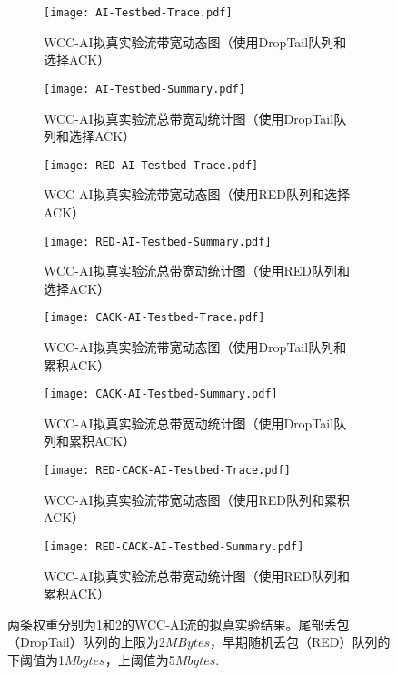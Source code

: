 \documentclass[winfonts]{njuthesis}
\begin{document}
\begin{figure*}[h]
	\begin{subfigure}{.5\textwidth}
    \centering
		\texttt{[image: AI-Testbed-Trace.pdf]}
    \caption{WCC-AI拟真实验流带宽动态图（使用DropTail队列和选择ACK）}
    \label{fig:AI-TestbedTrace}
  \end{subfigure}
	\begin{subfigure}{.5\textwidth}
    \centering
		\texttt{[image: AI-Testbed-Summary.pdf]}
    \caption{WCC-AI拟真实验流总带宽动统计图（使用DropTail队列和选择ACK）}
    \label{fig:AI-TestbedSum}
  \end{subfigure}
  \begin{subfigure}{.5\textwidth}
    \centering
		\texttt{[image: RED-AI-Testbed-Trace.pdf]}
    \caption{WCC-AI拟真实验流带宽动态图（使用RED队列和选择ACK）}
    \label{fig:RED-AI-TestbedTrace}
  \end{subfigure}
  \begin{subfigure}{.5\textwidth}
    \centering
		\texttt{[image: RED-AI-Testbed-Summary.pdf]}
    \caption{WCC-AI拟真实验流总带宽动统计图（使用RED队列和选择ACK）}
    \label{fig:RED-AI-TestbedSum}
  \end{subfigure}
	\begin{subfigure}{.5\textwidth}
    \centering
    \texttt{[image: CACK-AI-Testbed-Trace.pdf]}
    \caption{WCC-AI拟真实验流带宽动态图（使用DropTail队列和累积ACK）}
		\label{fig:CACK-AI-TestbedTrace}
  \end{subfigure}
	\begin{subfigure}{.5\textwidth}
    \centering
    \texttt{[image: CACK-AI-Testbed-Summary.pdf]}
    \caption{WCC-AI拟真实验流总带宽动统计图（使用DropTail队列和累积ACK）}
		\label{fig:CACK-AI-TestbedSum}
  \end{subfigure}
	\begin{subfigure}{.5\textwidth}
    \centering
    \texttt{[image: RED-CACK-AI-Testbed-Trace.pdf]}
    \caption{WCC-AI拟真实验流带宽动态图（使用RED队列和累积ACK）}
		\label{fig:RED-CACK-AI-TestbedTrace}
  \end{subfigure}
	\begin{subfigure}{.5\textwidth}
    \centering
    \texttt{[image: RED-CACK-AI-Testbed-Summary.pdf]}
    \caption{WCC-AI拟真实验流总带宽动统计图（使用RED队列和累积ACK）}
		\label{fig:RED-CACK-AI-TestbedSum}
  \end{subfigure}
  \caption{两条权重分别为1和2的WCC-AI流的拟真实验结果。尾部丢包（DropTail）队列的上限为2$MBytes$，早期随机丢包（RED）队列的下阈值为1$Mbytes$，上阈值为5$Mbytes$.}
  \label{fig:TestbedExp}
\end{figure*}
\end{document}
